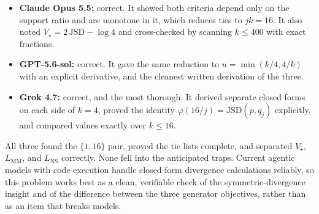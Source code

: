 \begin{itemize}
  \item \textbf{Claude Opus 5.5:} correct. It showed both criteria depend only
        on the support ratio and are monotone in it, which reduces ties to
        \(jk=16\). It also noted \(V_\star=2\,\mathrm{JSD}-\log4\) and
        cross-checked by scanning \(k\le400\) with exact fractions.
  \item \textbf{GPT-5.6-sol:} correct. It gave the same reduction to
        \(u=\min(k/4,4/k)\) with an explicit derivative, and the cleanest
        written derivation of the three.
  \item \textbf{Grok 4.7:} correct, and the most thorough. It derived
        separate closed forms on each side of \(k=4\), proved the identity
        \(\varphi(16/j)=\mathrm{JSD}(p,q_j)\) explicitly, and compared
        values exactly over \(k\le16\).
\end{itemize}
All three found the \(\{1,16\}\) pair, proved the tie lists complete, and
separated \(V_\star\), \(L_{\mathrm{MM}}\), and \(L_{\mathrm{NS}}\) correctly.
None fell into the anticipated traps. Current agentic models with code
execution handle closed-form divergence calculations reliably, so this
problem works best as a clean, verifiable check of the symmetric-divergence
insight and of the difference between the three generator objectives, rather
than as an item that breaks models.
